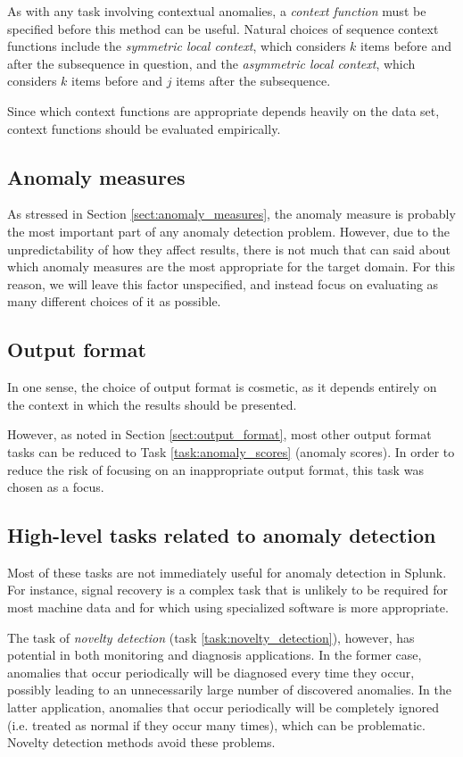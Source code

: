 As with any task involving contextual anomalies, a \emph{context function} must be specified before this method can be useful. Natural choices of sequence context functions include the \emph{symmetric local context}, which considers $k$ items before and after the subsequence in question, and the \emph{asymmetric local context}, which considers $k$ items before and $j$ items after the subsequence.

Since which context functions are appropriate depends heavily on the data set, context functions should be evaluated empirically.

\subsection{Anomaly measures}

As stressed in Section \ref{sect:anomaly_measures}, the anomaly measure is probably the most important part of any anomaly detection problem. However, due to the unpredictability of how they affect results, there is not much that can said about which anomaly measures are the most appropriate for the target domain. For this reason, we will leave this factor unspecified, and instead focus on evaluating as many different choices of it as possible.

\subsection{Output format}

In one sense, the choice of output format is cosmetic, as it depends entirely on the context in which the results should be presented. 

However, as noted in Section \ref{sect:output_format}, most other output format tasks can be reduced to Task \ref{task:anomaly_scores} (anomaly scores). In order to reduce the risk of focusing on an inappropriate output format, this task was chosen as a focus.

\subsection{High-level tasks related to anomaly detection}

Most of these tasks are not immediately useful for anomaly detection in Splunk. For instance, signal recovery is a complex task that is unlikely to be required for most machine data and for which using specialized software is more appropriate.

The task of \emph{novelty detection} (task \ref{task:novelty_detection}), however, has potential in both monitoring and diagnosis applications. In the former case, anomalies that occur periodically will be diagnosed every time they occur, possibly leading to an unnecessarily large number of discovered anomalies. In the latter application, anomalies that occur periodically will be completely ignored (i.e. treated as normal if they occur many times), which can be problematic. Novelty detection methods avoid these problems.

